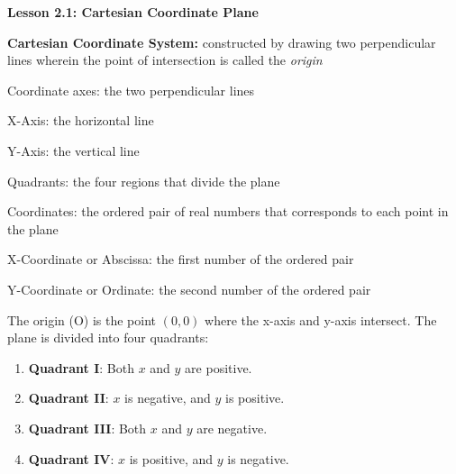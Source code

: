  \begin{center}
\textbf{Lesson 2.1: Cartesian Coordinate Plane}
\end{center}

\vspace*{1ex}


\textbf{Cartesian Coordinate System:} constructed by drawing two perpendicular lines wherein the point of intersection is called the \emph{origin  }

Coordinate axes: the two perpendicular lines

X-Axis: the horizontal line

Y-Axis: the vertical line

Quadrants: the four regions that divide the plane

Coordinates: the ordered pair of real numbers that corresponds to each point in the plane
 
X-Coordinate or Abscissa: the first number of the ordered pair

Y-Coordinate or Ordinate: the second  number of the ordered pair


The origin (O) is the point \((0, 0)\) where the x-axis and y-axis intersect. The plane is divided into four quadrants:
\begin{enumerate}
    \item \textbf{Quadrant I}: Both \(x\) and \(y\) are positive.
    \item \textbf{Quadrant II}: \(x\) is negative, and \(y\) is positive.
    \item \textbf{Quadrant III}: Both \(x\) and \(y\) are negative.
    \item \textbf{Quadrant IV}: \(x\) is positive, and \(y\) is negative.
\end{enumerate}
